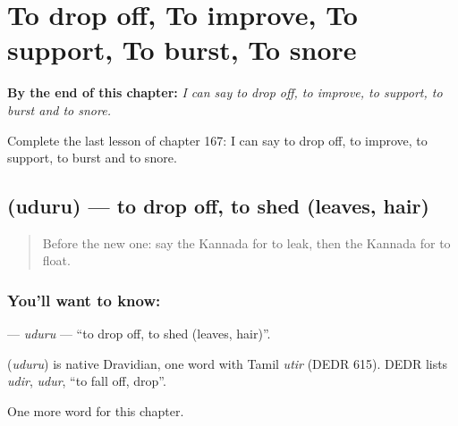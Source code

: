 
\chapter{To drop off, To improve, To support, To burst, To snore}
\label{ch:ka-to-drop-off-to-improve-to-support-to-burst-to-snore}

\begin{chapteropening}
\textbf{By the end of this chapter:} \emph{I can say to drop off, to improve, to support, to burst and to snore.}

Complete the last lesson of chapter 167: I can say to drop off, to improve, to support, to burst and to snore.
\end{chapteropening}

\section[\texorpdfstring{\kn{ಉದುರು} (uduru)}{ಉದುರು (uduru)}]{ (uduru) — to drop off, to shed (leaves, hair)}

\label{lesson:KA-C167-uduru}



\begin{quote}
Before the new one: say the Kannada for to leak, then the Kannada for to float.
\end{quote}

\subsection*{You'll want to know: }
\textbf{} — \emph{uduru} — \textquotedblleft{}to drop off, to shed (leaves, hair)\textquotedblright{}.

\begin{cousinweb}
\textbf{} (\emph{uduru}) is native Dravidian, one word with Tamil \emph{utir} (DEDR 615). DEDR lists \emph{udir}, \emph{udur}, \textquotedblleft{}to fall off, drop\textquotedblright{}.
\end{cousinweb}

\begin{grammarlens}[title={What you've built}]
One more word for this chapter.
\end{grammarlens}

